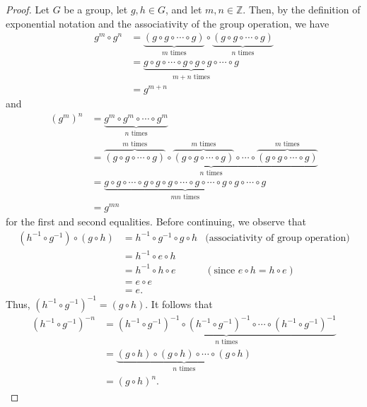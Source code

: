 \documentclass[12pt, titlepage]{amsart}
\newcommand\Z{{\mathbb Z}}
\theoremstyle{definition}
\begin{document}
	\begin{proof}
		Let $G$ be a group, let $g,h \in G$, and let $m,n \in \Z$.
		Then, by the definition of exponential notation and the associativity of the group operation, we have 
		\begin{align*}
			g^m \circ g^n &= \underbrace{(g \circ g \circ \cdots \circ g)}_{m \text{ times}} \circ \underbrace{(g \circ g \circ \cdots \circ g)}_{n \text{ times}} \\
			&= \underbrace{g \circ g \circ \cdots \circ g \circ g \circ g \circ \cdots \circ g}_{m + n \text{ times}} \\
			&= g^{m + n} 
		\end{align*}
		and 
		\begin{align*}
			(g^m)^n &= \underbrace{g^m \circ g^m \circ \cdots \circ g^m}_{n \text{ times}} \\
			&= \underbrace{\overbrace{(g \circ g \circ \cdots \circ g)}^{m \text{ times}} \circ \overbrace{(g \circ g \circ \cdots \circ g)}^{m \text{ times}} \circ \cdots \circ \overbrace{(g \circ g \circ \cdots \circ g)}^{m \text{ times}}}_{n \text{ times}} \\
			&= \underbrace{g \circ g \circ \cdots \circ g \circ g \circ g \circ \cdots \circ g \circ \cdots \circ g \circ g \circ \cdots \circ g}_{mn \text{ times}} \\
			&= g^{mn}
		\end{align*}
		for the first and second equalities.
		Before continuing, we observe that
		\begin{align*}
			(h^{-1} \circ g^{-1}) \circ (g \circ h)
			&= h^{-1} \circ g^{-1} \circ g \circ h & \text{(associativity of group operation)} \\
			&=	 h^{-1} \circ e \circ h \\
			&= h^{-1} \circ h \circ e & (\text{since } e \circ h = h \circ e) \\
			&= e \circ e \\
			&= e.
		\end{align*}
		Thus, $(h^{-1} \circ g^{-1})^{-1} = (g \circ h)$. 
		It follows that 
		\begin{align*}
			(h^{-1} \circ g^{-1})^{-n} &= \underbrace{(h^{-1} \circ g^{-1})^{-1} \circ (h^{-1} \circ g^{-1})^{-1} \circ \cdots \circ (h^{-1} \circ g^{-1})^{-1}}_{n \text{ times}} \\
			&= \underbrace{(g \circ h) \circ (g \circ h) \circ \cdots \circ (g \circ h)}_{n \text{ times}} \\
			&= (g \circ h)^n.
		\end{align*}

	\end{proof}
	
\end{document}
